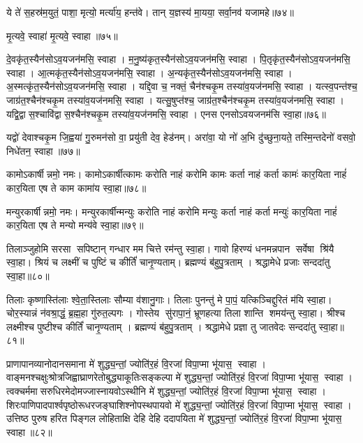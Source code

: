 ये ते॑ स॒हस्र॑म॒युतं॒ पाशा॒ मृत्यो॒ मर्त्या॑य॒ हन्त॑वे। तान् य॒ज्ञस्य॑ मा॒यया॒ सर्वा॒नव॑ यजामहे॥७४॥\anuvakamend
 
मृ॒त्यवे॒ स्वाहा॑ मृ॒त्यवे॒ स्वाहा॥७५॥%
\anuvakamend 

दे॒वकृ॑त॒स्यैन॑सोऽव॒यजन॑मसि॒ स्वाहा। म॒नु॒ष्य॑कृत॒स्यैन॑सो\-ऽव॒यजन॑मसि॒ स्वाहा। 
पि॒तृकृ॑त॒स्यैन॑सो\-ऽव॒यजन॑मसि॒ स्वाहा। आ॒त्मकृ॑त॒स्यैन॑सो\-ऽव॒यजन॑मसि॒ स्वाहा। 
अ॒न्यकृ॑त॒स्यैन॑सो\-ऽव॒यजन॑मसि॒ स्वाहा। अ॒स्मत्कृ॑त॒स्यैन॑सो\-ऽव॒यजन॑मसि॒ स्वाहा। 
यद्दि॒वा च॒ नक्तं॒ चैन॑श्चकृ॒म तस्या॑व॒यज॑नमसि॒ स्वाहा। यत्स्व॒पन्त॑श्च॒ जाग्र॑त॒श्चैन॑श्चकृ॒म तस्या॑व॒यज॑नमसि॒ स्वाहा। 
यत्सु॒षुप्त॑श्च॒ जाग्र॑त॒श्चैन॑श्चकृ॒म तस्या॑व॒यज॑नमसि॒ स्वाहा। यद्वि॒द्वास॒श्चावि॑द्वास॒श्चैन॑श्चकृ॒म तस्या॑व॒यज॑नमसि॒ स्वाहा। एनस एनसोऽवयजनम॑सि स्वा॒हा॥७६॥\anuvakamend

यद्वो॑ देवाश्चकृ॒म जि॒ह्वया॑ गु॒रुमन॑सो वा॒ प्रयु॑ती देव॒ हेड॑नम्। अरा॑वा॒ यो नो॑ अ॒भि दु॑च्छुना॒यते॒ तस्मि॒न्तदेनो॑ वसवो॒ निधे॑तन॒ स्वाहा॥७७॥ \anuvakamend



कामोऽकार्\mbox{}षीन्नमो॒ नमः।  कामोऽकार्\mbox{}षीत्कामः करोति नाहं करोमि कामः कर्ता नाहं कर्ता कामः॑ कार॒यिता नाहं॑ कार॒यिता एष ते काम कामा॑य स्वा॒हा॥७८॥
\anuvakamend

मन्युरकार्\mbox{}षीन्नमो॒ नमः। मन्युरकार्\mbox{}षीन्मन्युः करोति नाहं करोमि मन्युः कर्ता नाहं कर्ता मन्युः॑ कार॒यिता नाहं॑ कार॒यिता एष ते मन्यो मन्य॑वे स्वा॒हा॥७९॥
\anuvakamend

तिलाञ्जुहोमि सरसा सपिष्टान् गन्धार मम चित्ते रम॑न्तु स्वा॒हा। गावो हिरण्यं धनमन्नपान सर्वेषा श्रि॑यै स्वा॒हा। श्रियं च लक्ष्मीं च पुष्टिं च कीर्तिं॑ चानृ॒ण्यताम्। ब्रह्मण्यं ब॑हुपु॒त्रताम् । श्रद्धामेधे प्रजाः सन्ददा॑तु स्वा॒हा॥८०॥
\anuvakamend

तिलाः कृष्णास्ति॑लाः श्वे॒ता॒स्तिलाः सौम्या व॑शानु॒गाः। तिलाः पुनन्तु॑ मे पा॒पं॒ यत्किञ्चिद्दुरितं म॑यि स्वा॒हा। चोर॒स्यान्नं न॑वश्रा॒द्धं॒ ब्र॒ह्म॒हा गु॑रुत॒ल्पगः । गोस्तेय सु॑रापा॒नं॒ भ्रूणहत्या तिला शान्ति शमय॑न्तु स्वा॒हा। श्रीश्च लक्ष्मीश्च पुष्टीश्च कीर्तिं॑ चानृ॒ण्यताम् । ब्रह्मण्यं ब॑हुपु॒त्रताम् । श्रद्धामेधे प्रज्ञा तु जातवेदः सन्ददा॑तु स्वा॒हा॥८१॥
 \anuvakamend

प्राणापानव्यानोदानसमाना मे॑ शुद्ध्य॒न्तां॒ ज्योति॑र॒हं वि॒रजा॑ विपा॒प्मा भू॑यास॒ स्वाहा।
वाङ्मनश्चक्षुःश्रोत्रजिह्वाघ्राणरेतो\-बुद्ध्याकूतिः\-सङ्कल्पा मे॑ शुद्ध्य॒न्तां॒ ज्योति॑र॒हं वि॒रजा॑ विपा॒प्मा भू॑यास॒ स्वाहा। त्वक्चर्ममासरुधिरमेदोमज्जास्नायवो\-ऽस्थीनि  मे॑ शुद्ध्य॒न्तां॒ ज्योति॑र॒हं वि॒रजा॑ विपा॒प्मा भू॑यास॒ स्वाहा। शिरःपाणिपादपार्श्वपृष्ठोरूधरजङ्घाशिश्नोपस्थपायवो  मे॑ शुद्ध्य॒न्तां॒ ज्योति॑र॒हं वि॒रजा॑ विपा॒प्मा भू॑यास॒ स्वाहा।
उत्तिष्ठ पुरुष हरित पिङ्गल लोहिताक्षि देहि देहि ददापयिता मे॑ शुद्ध्य॒न्तां॒ ज्योति॑र॒हं वि॒रजा॑ विपा॒प्मा भू॑यास॒ स्वाहा॥८२॥ \anuvakamend

